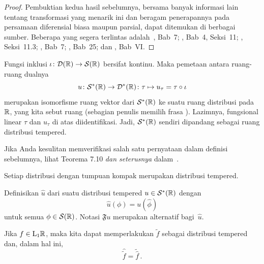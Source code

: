 \begin{proof} Pembuktian kedua hasil sebelumnya, bersama banyak informasi lain tentang transformasi yang menarik ini
dan beragam penerapannya pada persamaan diferensial biasa maupun parsial, dapat ditemukan di berbagai sumber.
Beberapa yang segera terlintas adalah~\cite{Cerda:2010}, Bab~7; \cite{Horvath:1966}, Bab~4, Seksi~11;
\cite{McDonaldW:1999}, Seksi~11.3; \cite{Rudin:1991}, Bab~7; \cite{Treves:1967}, Bab~25; dan \cite{Yosida:1965},
Bab~VI.   \ns
\end{proof}

\begin{defn} Fungsi inklusi $\iota\colon \mathcal{D}(\mathbb{R}) \rightarrow \mathcal{S}(\mathbb{R})$ bersifat kontinu. Maka pemetaan antara ruang-ruang dualnya
   \[ u\colon \mathcal{S}^*(\mathbb{R}) \rightarrow \mathcal{D}^*(\mathbb{R})\colon \tau \mapsto u_\tau = \tau \circ \iota \]
merupakan isomorfisme ruang vektor dari $\mathcal{S}^*(\mathbb{R})$ ke suatu ruang distribusi pada~$\mathbb{R}$, yang kita sebut ruang
 (sebagian penulis memilih frasa
). Lazimnya, fungsional linear $\tau$ dan $u_\tau$ di atas diidentifikasi. Jadi, $\mathcal{S}^*(\mathbb{R})$
sendiri dipandang sebagai ruang distribusi tempered.
\end{defn}

Jika Anda kesulitan memverifikasi salah satu pernyataan dalam definisi sebelumnya, lihat Teorema 7.10\emph{ dan seterusnya} dalam~\cite{Rudin:1991}.

\begin{exam} Setiap distribusi dengan tumpuan kompak merupakan distribusi tempered.
\end{exam}

\begin{defn} Definisikan
 $\hat u$ dari suatu distribusi tempered $u \in \mathcal{S}^*(\mathbb{R})$ dengan
   \[ \hat u(\phi) = u(\hat\phi) \]
untuk semua $\phi \in \mathcal{S}(\mathbb{R})$. Notasi $\mathfrak Fu$ merupakan alternatif bagi~$\hat u$.
\end{defn}

\begin{prop} Jika $f \in \mathrm{L_{1}}\mathbb{R}$, maka kita dapat memperlakukan $\tilde f$ sebagai distribusi tempered dan, dalam hal ini,
   \[ \hat{\tilde f} = \tilde{\hat f}\,. \]
\end{prop}

